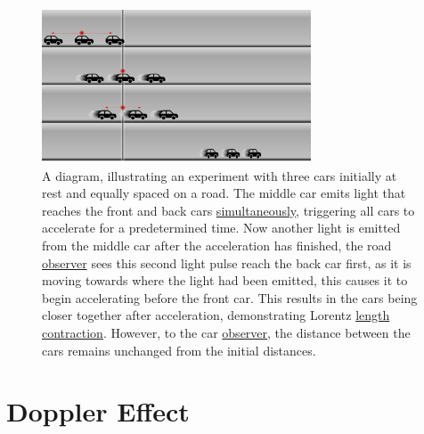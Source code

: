 \begin{figure}[H]
	\centering
	\includegraphics[width = 8cm]{images/pdf/cars.pdf}
	\caption{A diagram, illustrating an experiment with three cars initially at rest and equally spaced on a road. The middle car emits light that reaches the front and back cars \protect\hyperlink{def-simultaneity}{simultaneously}, triggering all cars to accelerate for a predetermined time. Now another light is emitted from the middle car after the acceleration has finished, the road \protect\hyperlink{def-observer}{observer} sees this second light pulse reach the back car first, as it is moving towards where the light had been emitted, this causes it to begin accelerating before the front car. This results in the cars being closer together after acceleration, demonstrating Lorentz \protect\hyperlink{def-length-contraction}{length contraction}. However, to the car \protect\hyperlink{def-observer}{observer}, the distance between the cars remains unchanged from the initial distances.}
	\label{fig: cars}
\end{figure}

\section{Doppler Effect} \label{sect: Doppler Effect}

